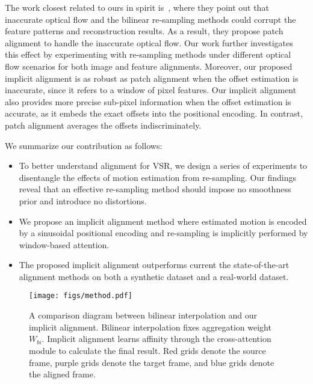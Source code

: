 \documentclass[10pt,twocolumn,letterpaper]{article}
\newcommand{\tpt}[1]{{\color{purple} {#1}}}
\newcommand{\tvt}[1]{{\color{violet} {#1}}}
\newcommand{\tct}[1]{{\color{cyan} {#1}}}
\begin{document}
The work closest related to ours in spirit is~\cite{shi2022rethinking}, where they point out that inaccurate optical flow and the bilinear re-sampling methods could corrupt the feature patterns and reconstruction results. As a result, they propose patch alignment to handle the inaccurate optical flow. Our work further investigates this effect by experimenting with re-sampling methods under different optical flow scenarios for both image and feature alignments. Moreover, our proposed implicit alignment is as robust as patch alignment when the offset estimation is inaccurate, since it refers to a window of pixel features. Our implicit alignment also provides more precise sub-pixel information when the offset estimation is accurate, as it embeds the exact offsets into the positional encoding.  In contrast, patch alignment averages the offsets indiscriminately.





We summarize our contribution as follows:
\begin{itemize}
    \item To better understand alignment for VSR, we design a series of experiments to disentangle the effects of motion estimation from re-sampling. Our findings reveal that an effective re-sampling method should impose no smoothness prior and introduce no distortions.
    \item We propose an implicit alignment method where estimated motion is encoded by a sinusoidal positional encoding and re-sampling is implicitly performed by window-based attention.
    \item The proposed implicit alignment outperforms current the state-of-the-art alignment methods on both a synthetic dataset and a real-world dataset.
\end{itemize}


\begin{figure*}[t]
\centering

\texttt{[image: figs/method.pdf]}
\vspace{-.3cm}
\caption{A comparison diagram between bilinear interpolation and our implicit alignment. Bilinear interpolation fixes aggregation weight $W_{bi}$. Implicit alignment learns affinity through the cross-attention module to calculate the final result. \tpt{Red grids} denote the source frame, \tvt{purple grids} denote the target frame, and \tct{blue grids} denote the aligned frame.}
\vspace{-.3cm}
\end{figure*}
\end{document}
